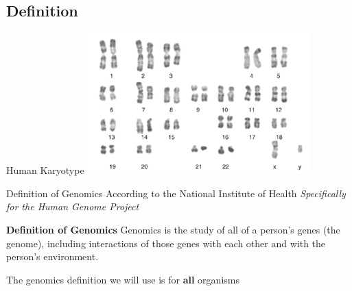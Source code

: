 \documentclass{beamer}
\begin{document}
    \subsection{Definition} %
    \begin{frame}{Human Karyotype}
        \centering
\includegraphics[scale=1]{karyotype.jpg}
    \end{frame}
    \begin{frame}{Definition of Genomics}
        According to the National Institute of Health \textit{Specifically for the Human Genome Project}
                \begin{block} {\textbf{Definition of Genomics}}
        Genomics is the study of all of a person's genes (the genome), including interactions of those genes with each other and with the person's environment. \cite{genomics-definition}
                \end{block}
    The genomics definition we will use is for \textbf{all} organisms
    \end{frame}
    
    
\end{document}
